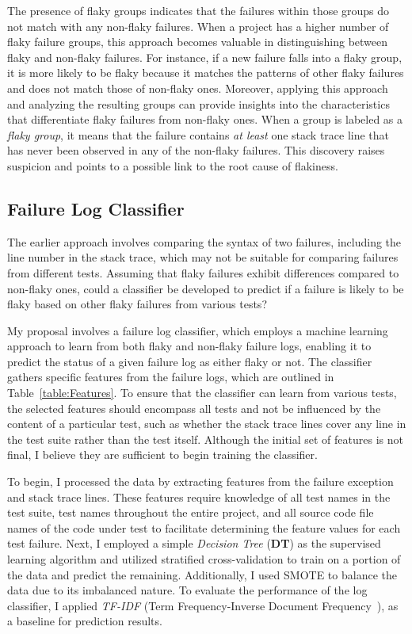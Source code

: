 The presence of flaky groups indicates that the failures within those groups do not match with any non-flaky failures. When a project has a higher number of flaky failure groups, this approach becomes valuable in distinguishing between flaky and non-flaky failures.
For instance, if a new failure falls into a flaky group, it is more likely to be flaky because it matches the patterns of other flaky failures and does not match those of non-flaky ones.
Moreover, applying this approach and analyzing the resulting groups can provide insights into the characteristics that differentiate flaky failures from non-flaky ones. When a group is labeled as a \emph{flaky group}, it means that the failure contains \emph{at least} one stack trace line that has never been observed in any of the non-flaky failures. This discovery raises suspicion and points to a possible link to the root cause of flakiness.


\subsection{Failure Log Classifier}
The earlier approach involves comparing the syntax of two failures, including the line number in the stack trace, which may not be suitable for comparing failures from different tests. Assuming that flaky failures exhibit differences compared to non-flaky ones, could a classifier be developed to predict if a failure is likely to be flaky based on other flaky failures from various tests?

My proposal involves a failure log classifier, which employs a machine learning approach to learn from both flaky and non-flaky failure logs, enabling it to predict the status of a given failure log as either flaky or not. The classifier gathers specific features from the failure logs, which are outlined in Table~\ref{table:Features}. To ensure that the classifier can learn from various tests, the selected features should encompass all tests and not be influenced by the content of a particular test, such as whether the stack trace lines cover any line in the test suite rather than the test itself. Although the initial set of features is not final, I believe they are sufficient to begin training the classifier.

To begin, I processed the data by extracting features from the failure exception and stack trace lines. These features require knowledge of all test names in the test suite, test names throughout the entire project, and all source code file names of the code under test to facilitate determining the feature values for each test failure. Next, I employed a simple \emph{Decision Tree} (\textbf{DT}) as the supervised learning algorithm and utilized stratified cross-validation to train on a portion of the data and predict the remaining. Additionally, I used SMOTE to balance the data due to its imbalanced nature. To evaluate the performance of the log classifier, I applied \emph{TF-IDF} (Term Frequency-Inverse Document Frequency~\cite{tfidf}), as a baseline for prediction results.



